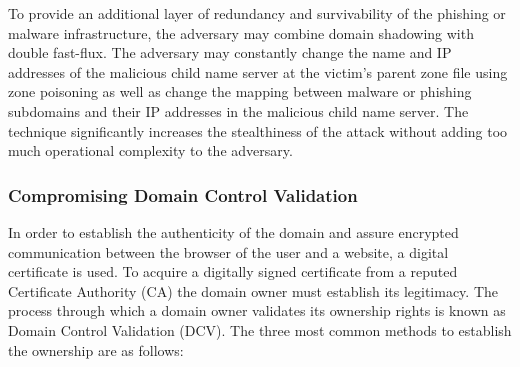 To provide an additional layer of redundancy and survivability of the phishing or malware infrastructure, the adversary may combine domain shadowing with double fast-flux.
The adversary may constantly change the name and IP addresses of the malicious child name server at the victim's parent zone file using zone poisoning as well as change the mapping between malware or phishing subdomains and their IP addresses in the malicious child name server. %
The technique significantly increases the stealthiness of the attack without adding too much operational complexity to the adversary. 


\subsubsection{Compromising Domain Control Validation\label{sec:domainvalidation}}


In order to establish the authenticity of the domain and assure encrypted communication between the browser of the user and a website, a digital certificate is used. 
%
To acquire a digitally signed certificate from a reputed Certificate Authority (CA) the domain owner must establish its legitimacy. The process through which a domain owner validates its ownership rights is known as Domain Control Validation (DCV). 
%
The three most common methods to establish the ownership are as follows:

